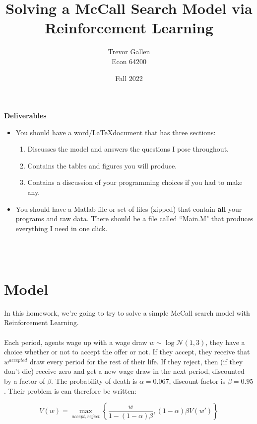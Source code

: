 \documentclass[11pt]{article}
\title{Solving a McCall Search Model via Reinforcement Learning}
\author{ Trevor Gallen \\ Econ 64200 }
\date{Fall 2022}
\begin{document}


\maketitle


\textbf{Deliverables}
\begin{itemize}
\item You should have a word/\LaTeX document that has three sections: 
\begin{enumerate}
\item Discusses the model and answers the questions I pose throughout.
\item Contains the tables and figures you will produce.
\item Contains a discussion of your programming choices if you had to make any.
\end{enumerate}
\item You should have a Matlab file or set of files (zipped) that contain \textbf{all} your programs and raw data.  There should be a file called ``Main.M" that produces everything I need in one click.
\end{itemize}
\ \\
\ \\


\section{Model}
In this homework, we're going to try to solve a simple McCall search model with Reinforcement Learning.  \\
\ \\
Each period, agents wage up with a wage draw  $w\sim\log\mathcal{N}\left(1,3\right)$, they have a choice whether or not to accept the offer or not.  If they accept, they receive that $w^{accepted}$ draw every period for the rest of their life.  If they reject, then (if they don't die) receive zero and get a new wage draw in the next period, discounted by a factor of $\beta$.  The probability of death is $\alpha=0.067$, discount factor is $\beta=0.95$.  Their problem is can therefore be written:

$$V(w)=\underset{accept,reject}{\max}\left\{\frac{w}{1-(1-\alpha)\beta},(1-\alpha)\beta V(w')\right\}$$
\end{document}
